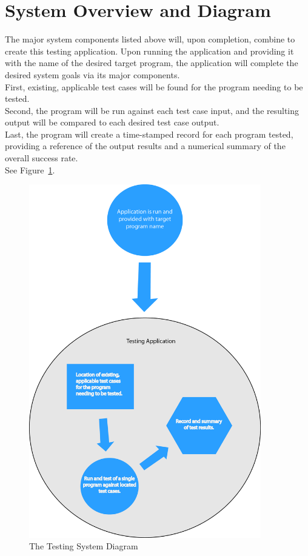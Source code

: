 \section{System Overview and Diagram}
The major system components listed above will, upon completion, combine to create this testing application. 
Upon running the application and providing it with the name of the desired target program, the application
will complete the desired system goals via its major components.
\\ First, existing, applicable test cases will be found for the program needing to be tested. 
\\ Second, the program will be run against each test case input, and the resulting output will be 
compared to each desired test case output.
\\  Last, the program will create a time-stamped record for each program tested, providing a reference of 
the output results and a numerical summary of the overall success rate.  
\\ See Figure~\ref{systemdiagram}.
\begin{figure}[H]
\begin{center}
\includegraphics[width=0.9\textwidth]{./diagram}
\end{center}
\caption{The Testing System Diagram \label{systemdiagram}}
\end{figure}



